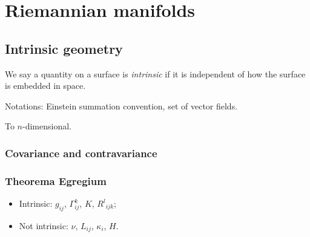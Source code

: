 \documentclass{../note}
\begin{document}
\part{Riemannian manifolds}


\chapter{Intrinsic geometry}

We say a quantity on a surface is \emph{intrinsic} if it is independent of how the surface is embedded in space.

Notations: Einstein summation convention, set of vector fields.

To $n$-dimensional.

\section{Covariance and contravariance}


\section{Theorema Egregium}

\begin{itemize}
\item Intrinsic: $g_{ij}$, $\Gamma_{ij}^k$, $K$, ${R^l}_{ijk}$;
\item Not intrinsic: $\nu$, $L_{ij}$, $\kappa_i$, $H$.
\end{itemize}
\end{document}
